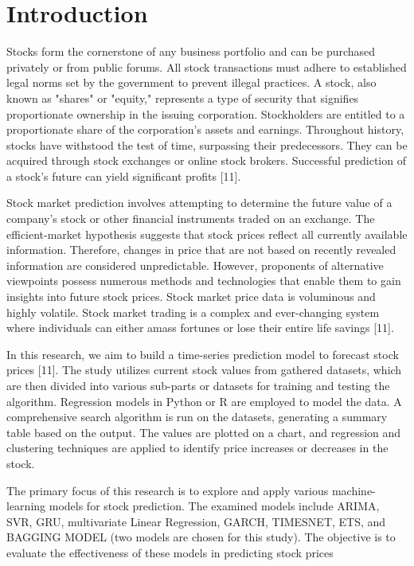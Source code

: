 \documentclass{ieeeojies}
\begin{document}
\section{Introduction}
\label{sec:introduction}
Stocks form the cornerstone of any business portfolio and can be purchased privately or from public forums. All stock transactions must adhere to established legal norms set by the government to prevent illegal practices. A stock, also known as "shares" or "equity," represents a type of security that signifies proportionate ownership in the issuing corporation. Stockholders are entitled to a proportionate share of the corporation's assets and earnings. Throughout history, stocks have withstood the test of time, surpassing their predecessors. They can be acquired through stock exchanges or online stock brokers. Successful prediction of a stock's future can yield significant profits [11].

Stock market prediction involves attempting to determine the future value of a company's stock or other financial instruments traded on an exchange. The efficient-market hypothesis suggests that stock prices reflect all currently available information. Therefore, changes in price that are not based on recently revealed information are considered unpredictable. However, proponents of alternative viewpoints possess numerous methods and technologies that enable them to gain insights into future stock prices. Stock market price data is voluminous and highly volatile. Stock market trading is a complex and ever-changing system where individuals can either amass fortunes or lose their entire life savings [11].

In this research, we aim to build a time-series prediction model to forecast stock prices [11]. The study utilizes current stock values from gathered datasets, which are then divided into various sub-parts or datasets for training and testing the algorithm. Regression models in Python or R are employed to model the data. A comprehensive search algorithm is run on the datasets, generating a summary table based on the output. The values are plotted on a chart, and regression and clustering techniques are applied to identify price increases or decreases in the stock.

The primary focus of this research is to explore and apply various machine-learning models for stock prediction. The examined models include ARIMA, SVR, GRU, multivariate Linear Regression, GARCH, TIMESNET, ETS, and BAGGING MODEL (two models are chosen for this study). The objective is to evaluate the effectiveness of these models in predicting stock prices
\end{document}
